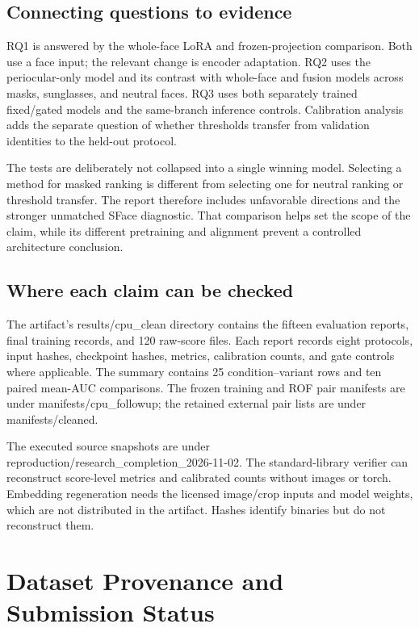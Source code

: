 \documentclass[12pt,a4paper,oneside]{report}
\begin{document}
\section{Connecting questions to evidence}
RQ1 is answered by the whole-face LoRA and frozen-projection comparison. Both use a face input; the relevant change is encoder adaptation. RQ2 uses the periocular-only model and its contrast with whole-face and fusion models across masks, sunglasses, and neutral faces. RQ3 uses both separately trained fixed/gated models and the same-branch inference controls. Calibration analysis adds the separate question of whether thresholds transfer from validation identities to the held-out protocol.

The tests are deliberately not collapsed into a single winning model. Selecting a method for masked ranking is different from selecting one for neutral ranking or threshold transfer. The report therefore includes unfavorable directions and the stronger unmatched SFace diagnostic. That comparison helps set the scope of the claim, while its different pretraining and alignment prevent a controlled architecture conclusion.

\section{Where each claim can be checked}
The artifact's results/cpu\_clean directory contains the fifteen evaluation reports, final training records, and 120 raw-score files. Each report records eight protocols, input hashes, checkpoint hashes, metrics, calibration counts, and gate controls where applicable. The summary contains 25 condition--variant rows and ten paired mean-AUC comparisons. The frozen training and ROF pair manifests are under manifests/cpu\_followup; the retained external pair lists are under manifests/cleaned.

The executed source snapshots are under reproduction/research\_completion\_2026-11-02. The standard-library verifier can reconstruct score-level metrics and calibrated counts without images or torch. Embedding regeneration needs the licensed image/crop inputs and model weights, which are not distributed in the artifact. Hashes identify binaries but do not reconstruct them.

\chapter{Dataset Provenance and Submission Status}
\end{document}
